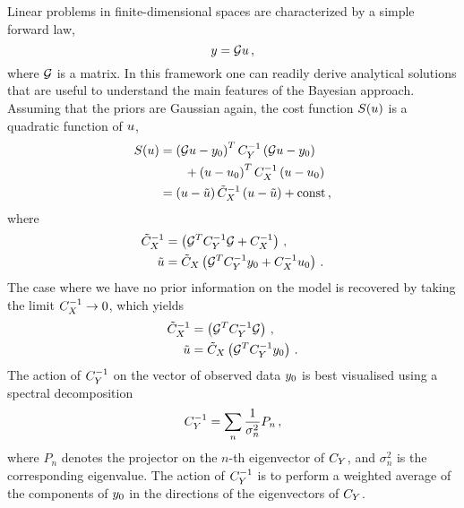 Linear problems in finite-dimensional spaces are characterized by a simple
forward law, 
\begin{equation}
  \label{eq:MatrixG}
  y = \mathcal{G} u\, ,
\end{equation}
where $\mathcal{G}$ is a matrix. In this framework one can readily  derive
analytical solutions that are useful to understand the main features of the
Bayesian approach. Assuming that the priors are Gaussian again, the cost
function $S(u)$ is a quadratic function of $u$,
\begin{align}
  \label{eq:CostLinGauss}
  S(u) &= 
  \left(\mathcal{G} u - y_0 \right)^T C_{Y}^{-1} 
  \left(\mathcal{G} u - y_0 \right) \nonumber \\
  &\quad \quad+ \left( u - u_0 \right)^T C_X^{-1} \left(u - u_0 \right) \\
  &= 
  \left(u - \tilde{u}\right) \tilde{C}_X^{-1}
  \left(u - \tilde{u}\right) + \mathrm{const}\, ,
\end{align} 
where
\begin{align}
  \label{eq:PostParamsCov}
  \tilde{C}_X^{-1} &= 
  \left(
    \mathcal{G}^T C_{Y}^{-1} \mathcal{G} + C_X^{-1}
  \right)\, , \\
  \label{eq:PostParamsMean}
  \tilde{u} &=
  \tilde{C}_X  \left(
    \mathcal{G}^T C_{Y}^{-1} y_0 + C_X^{-1} u_0
  \right)\, .
\end{align}
The case where we have no prior information on the model is recovered by taking
the limit $C_X^{-1} \to 0$, which yields
\begin{align}
  \label{eq:NoPriorLinModel}
  \tilde{C}_X^{-1} &= 
  \left(
    \mathcal{G}^T C_{Y}^{-1} \mathcal{G}
  \right)\, , \\
  \tilde{u} &=
  \tilde{C}_X  \left(
    \mathcal{G}^T C_{Y}^{-1} y_0 
  \right)\, . \label{eq:NoPriorLinModelCov}
\end{align}
The action of $C_{Y}^{-1}$ on the vector of observed data $y_0$
is best visualised using a spectral decomposition
\begin{equation}
  \label{eq:CDSpecDec}
  C_{Y}^{-1} = \sum_n \frac{1}{\sigma_n^2} P_n\, ,
\end{equation}
where $P_n$ denotes the projector on the $n$-th eigenvector of $C_{Y}$,
and $\sigma_n^2$ is the corresponding eigenvalue. The action of
$C_{Y}^{-1}$ is to perform a weighted average of the components of
$y_0$ in the directions of the eigenvectors of $C_{Y}$.

